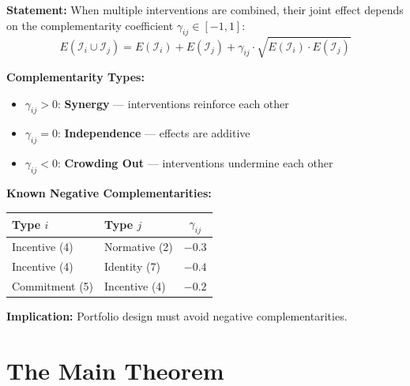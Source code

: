 \begin{tcolorbox}[colback=gray!5!white, colframe=gray!75!black,
    title=EIH Condition 3: Portfolio Complementarity (from HHH Axiom HHH-A4)]

\textbf{Statement:} When multiple interventions are combined, their joint effect
depends on the complementarity coefficient $\gamma_{ij} \in [-1, 1]$:
\begin{equation}
E(\mathcal{I}_i \cup \mathcal{I}_j) = E(\mathcal{I}_i) + E(\mathcal{I}_j) + \gamma_{ij} \cdot \sqrt{E(\mathcal{I}_i) \cdot E(\mathcal{I}_j)}
\label{eq:gamma-combination}
\end{equation}

\textbf{Complementarity Types:}
\begin{itemize}[nosep]
\item $\gamma_{ij} > 0$: \textbf{Synergy} --- interventions reinforce each other
\item $\gamma_{ij} = 0$: \textbf{Independence} --- effects are additive
\item $\gamma_{ij} < 0$: \textbf{Crowding Out} --- interventions undermine each other
\end{itemize}

\textbf{Known Negative Complementarities:}
\begin{center}
\renewcommand{\arraystretch}{1.2}
\begin{tabular}{@{}llc@{}}
\toprule
\textbf{Type $i$} & \textbf{Type $j$} & \textbf{$\gamma_{ij}$} \\
\midrule
Incentive (4) & Normative (2) & $-0.3$ \\
Incentive (4) & Identity (7) & $-0.4$ \\
Commitment (5) & Incentive (4) & $-0.2$ \\
\bottomrule
\end{tabular}
\end{center}

\textbf{Implication:} Portfolio design must avoid negative complementarities.
\end{tcolorbox}


\section{The Main Theorem}
\label{sec:eih-theorem}

